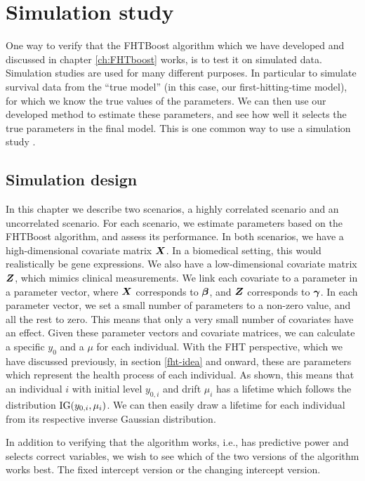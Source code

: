\chapter{Simulation study}
One way to verify that the FHTBoost algorithm which we have developed and discussed in chapter \ref{ch:FHTboost} works, is to test it on simulated data.
Simulation studies are used for many different purposes.
In particular to simulate survival data from the ``true model'' (in this case, our first-hitting-time model), for which we know the true values of the parameters.
We can then use our developed method to estimate these parameters, and see how well it selects the true parameters in the final model.
This is one common way to use a simulation study \citep{simulation-studies}.

\section{Simulation design}
In this chapter we describe two scenarios, a highly correlated scenario and an uncorrelated scenario. 
For each scenario, we estimate parameters based on the FHTBoost algorithm, and assess its performance.
In both scenarios, we have a high-dimensional covariate matrix $\bm{X}$.
In a biomedical setting, this would realistically be gene expressions.
We also have a low-dimensional covariate matrix $\bm{Z}$, which mimics clinical measurements.
We link each covariate to a parameter in a parameter vector, where $\bm{X}$ corresponds to $\boldsymbol{\beta}$, and $\bm{Z}$ corresponds to $\boldsymbol{\gamma}$.
In each parameter vector, we set a small number of parameters to a non-zero value, and all the rest to zero.
This means that only a very small number of covariates have an effect.
Given these parameter vectors and covariate matrices, we can calculate a specific $y_0$ and a $\mu$ for each individual.
With the FHT perspective, which we have discussed previously, in section \ref{fht-idea} and onward, these are parameters which represent the health process of each individual.
As shown, this means that an individual $i$ with initial level $y_{0,i}$ and drift $\mu_i$ has a lifetime which follows the distribution $\operatorname{IG}(y_{0,i},\mu_i)$.
We can then easily draw a lifetime for each individual from its respective inverse Gaussian distribution.

In addition to verifying that the algorithm works, i.e., has predictive power and selects correct variables, we wish to see which of the two versions of the algorithm works best.
The fixed intercept version or the changing intercept version.

